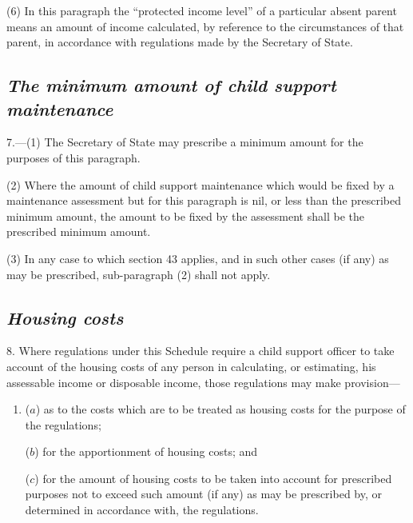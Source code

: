\documentclass[12pt,a4paper]{article}
\begin{document}
(6) In this paragraph the “protected income level” of a particular absent parent means an amount of income calculated, by reference to the circumstances of that parent, in accordance with regulations made by the Secretary of State.


\subsection*{\itshape The minimum amount of child support maintenance}

7.---(1) The Secretary of State may prescribe a minimum amount for the purposes of this paragraph.

(2) Where the amount of child support maintenance which would be fixed by a maintenance assessment but for this paragraph is nil, or less than the prescribed minimum amount, the amount to be fixed by the assessment shall be the prescribed minimum amount.

(3) In any case to which section 43 applies, and in such other cases (if any) as may be prescribed, sub-paragraph (2)  shall not apply.

\subsection*{\itshape Housing costs}

8. Where regulations under this Schedule require 
a child support officer 
to take account of the housing costs of any person in calculating, or estimating, his assessable income or disposable income, those regulations may make provision—
\begin{enumerate}\item[]
($a$) as to the costs which are to be treated as housing costs for the purpose of the regulations;

($b$) for the apportionment of housing costs; and

($c$) for the amount of housing costs to be taken into account for prescribed purposes not to exceed such amount (if any) as may be prescribed by, or determined in accordance with, the regulations.
\end{enumerate}
\end{document}
